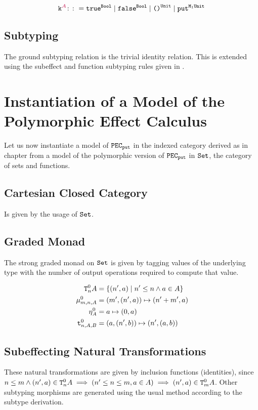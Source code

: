 \documentclass{Report}
\begin{document}
    \begin{equation}
        \label{AdequacyConstants}
        \texttt{k}^{\color{purple} A} \colon\colon= \texttt{true}^{\texttt{Bool}} \mid \texttt{false}^{\texttt{Bool}} \mid \texttt{()}^{\texttt{Unit}} \mid \texttt{put}^{\texttt{M}_{1}{\texttt{Unit}}}        
    \end{equation}

    \subsection{Subtyping}
    The ground subtyping relation is the trivial identity relation. This is extended using the subeffect and function subtyping rules given in .


    \section{Instantiation of a Model of the Polymorphic Effect Calculus}

    Let us now instantiate a model of $\texttt{PEC}_{\texttt{put}}$ in the indexed category derived as in chapter  from a model of the polymorphic version of $\texttt{PEC}_{\texttt{put}}$ in $\texttt{Set}$, the category of sets and functions.

    \subsection{Cartesian Closed Category}
    Is given by the usage of $\texttt{Set}$.
    
    \subsection{Graded Monad}
    The strong graded monad on $\texttt{Set}$ is given by tagging values of the underlying type with the number of output operations required to compute that value.

    \begin{align}
        \label{AdequacyGradedMonad}
        \texttt{T}^0_{n}A & = \{(n', a) \mid n'\leq n\wedge a\in A \}\\
        \mu_{m, n, A}^0 & = (m', (n', a))\mapsto (n' + m', a)\\
        \eta_{A}^0 & = a\mapsto (0, a)\\\
        \texttt{t}_{n, A, B}^0 & = (a, (n', b)) \mapsto (n', (a, b))
    \end{align}


\subsection{Subeffecting Natural Transformations}
These natural transformations are given by inclusion functions (identities), since $n\leq m\wedge (n',a)\in\texttt{T}^0_{n}A \implies (n'\leq n \leq m, a\in A)\implies (n',a)\in\texttt{T}^0_{m}A$. Other subtyping morphisms are generated using the usual method according to the subtype derivation.
\end{document}
